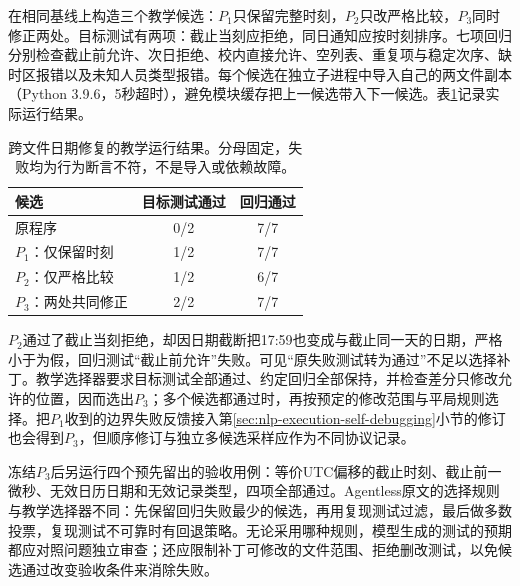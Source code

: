 在相同基线上构造三个教学候选：$P_1$只保留完整时刻，$P_2$只改严格比较，$P_3$同时修正两处。目标测试有两项：截止当刻应拒绝，同日通知应按时刻排序。七项回归分别检查截止前允许、次日拒绝、校内直接允许、空列表、重复项与稳定次序、缺时区报错以及未知人员类型报错。每个候选在独立子进程中导入自己的两文件副本（Python 3.9.6，5秒超时），避免模块缓存把上一候选带入下一候选。表\ref{tab:nlp-execution-patches}记录实际运行结果。

\begin{table}[htbp]
  \centering
  \begin{tabular}{lcc}
    \toprule
    候选 & 目标测试通过 & 回归通过 \\
    \midrule
    原程序 & 0/2 & 7/7 \\
    $P_1$：仅保留时刻 & 1/2 & 7/7 \\
    $P_2$：仅严格比较 & 1/2 & 6/7 \\
    $P_3$：两处共同修正 & 2/2 & 7/7 \\
    \bottomrule
  \end{tabular}
  \caption{跨文件日期修复的教学运行结果。分母固定，失败均为行为断言不符，不是导入或依赖故障。}
  \label{tab:nlp-execution-patches}
\end{table}
\FloatBarrier

$P_2$通过了截止当刻拒绝，却因日期截断把17:59也变成与截止同一天的日期，严格小于为假，回归测试“截止前允许”失败。可见“原失败测试转为通过”不足以选择补丁。教学选择器要求目标测试全部通过、约定回归全部保持，并检查差分只修改允许的位置，因而选出$P_3$；多个候选都通过时，再按预定的修改范围与平局规则选择。把$P_1$收到的边界失败反馈接入第\ref{sec:nlp-execution-self-debugging}小节的修订也会得到$P_3$，但顺序修订与独立多候选采样应作为不同协议记录。

冻结$P_3$后另运行四个预先留出的验收用例：等价UTC偏移的截止时刻、截止前一微秒、无效日历日期和无效记录类型，四项全部通过。Agentless原文的选择规则与教学选择器不同：先保留回归失败最少的候选，再用复现测试过滤，最后做多数投票，复现测试不可靠时有回退策略。无论采用哪种规则，模型生成的测试的预期都应对照问题独立审查；还应限制补丁可修改的文件范围、拒绝删改测试，以免候选通过改变验收条件来消除失败。
